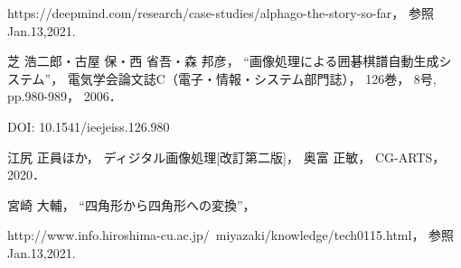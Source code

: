 \documentclass[openright]{nitocs}
\numberwithin{equation}{section}
\begin{document}
\begin{thebibliography}{10}
        https://deepmind.com/research/case-studies/alphago-the-story-so-far，
        参照Jan.13,2021.

        芝 浩二郎・古屋 保・西 省吾・森 邦彦，
        ``画像処理による囲碁棋譜自動生成システム''，
        電気学会論文誌C（電子・情報・システム部門誌），
        126巻，
        8号, 
        pp.980-989，
        2006．

        DOI: 10.1541/ieejeiss.126.980

        江尻 正員ほか，
        ディジタル画像処理[改訂第二版]，
        奥富 正敏，
        CG-ARTS，
        2020．

        宮崎 大輔，
        ``四角形から四角形への変換''，

        http://www.info.hiroshima-cu.ac.jp/~miyazaki/knowledge/tech0115.html，
        参照Jan.13,2021.

    \end{thebibliography}
\end{document}
